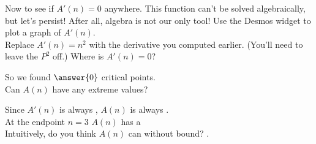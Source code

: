 \documentclass[handout,nooutcomes]{ximera}
\begin{document}
\bigskip

\hspace{2cm}Now to see if $A'(n)=0$ anywhere. This function can't be solved algebraically, but let's persist! After all, algebra is not our only tool! Use the Desmos widget to plot a graph of $A'(n)$.\\
Replace $A'(n)=n^2$ with the derivative you computed earlier. (You'll need to leave the $P^2$ off.)
Where is $A'(n)=0$?\\
\begin{multipleChoice}
\end{multipleChoice}

\bigskip

So we found $\answer{0}$ critical points.\\
Can $A(n)$ have any extreme values?\\
\begin{multipleChoice}
\end{multipleChoice}

\bigskip

Since $A'(n)$ is always , $A(n)$ is always .\\
At the endpoint $n=3$ $A(n)$ has a \\
Intuitively, do you think $A(n)$ can  without bound? .\\ %

\medskip
\end{document}
